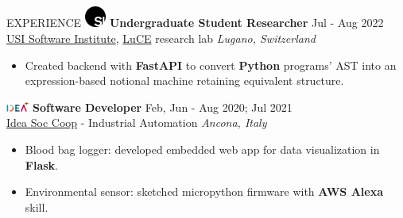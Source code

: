 \documentclass{cv} %
\def\intraexpvspace{0.15cm}
\begin{document}
\begin{minipage}[b][0.9\paperheight][t]{0.7\linewidth}
\begin{rSection}{EXPERIENCE}
    \includegraphics[width=0.7cm, trim={0cm 10cm 0cm 0cm}]{si-icon.jpg}
    \hspace*{0cm}\textbf{Undergraduate Student Researcher} \hfill Jul - Aug 2022\\
    \hspace*{0.85cm}\href{https://www.si.usi.ch/}{USI Software Institute},
    \href{https://luce.si.usi.ch/team/}{LuCE} research lab
    \hfill \textit{Lugano, Switzerland}
    \begin{itemize}
        \item Created backend with \textbf{FastAPI} to convert \textbf{Python} programs' AST
              into an expression-based notional machine retaining equivalent structure.
    \end{itemize}
    \vspace{\intraexpvspace}
    \vspace{\intraexpvspace}

    \includegraphics[width=0.75cm, trim={0cm 1.5cm 0cm 0cm}]{idea-icon.png}
    \textbf{Software Developer} \hfill Feb, Jun - Aug 2020; Jul 2021\\
    \hspace*{0.85cm}\href{https://idea-on-line.it/}{Idea Soc Coop} - Industrial Automation 
    \hfill \textit{Ancona, Italy}
    \begin{itemize}
        \item Blood bag logger: 
            developed embedded web app for data visualization in \textbf{Flask}.

        \item Environmental sensor: 
            sketched micropython firmware with \textbf{AWS Alexa} skill.
    \end{itemize}
    \vspace{\intraexpvspace}
    \vspace{\intraexpvspace}


\end{rSection}
\end{minipage}
\end{document}
